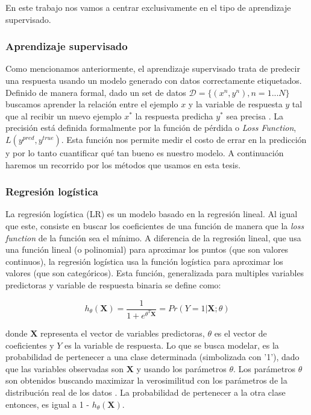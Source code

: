 En este trabajo nos vamos a centrar exclusivamente en el tipo de aprendizaje supervisado.

\subsubsection{Aprendizaje supervisado}

Como mencionamos anteriormente, el aprendizaje supervisado trata de predecir una respuesta usando un modelo generado con datos correctamente etiquetados. Definido de manera formal, dado un set de datos $ \mathcal{D} = \{(x^n, y^n), n = 1...N\}$  buscamos aprender la relación entre el ejemplo $x$ y la variable de respuesta $y$ tal que al recibir un nuevo ejemplo $x^*$ la respuesta predicha $y^*$ sea precisa \cite{Barber2011}. La precisión está definida formalmente por la función de pérdida o \textit{Loss Function}, $L(y^{pred}, y^{true})$. Esta función nos permite medir el costo de errar en la predicción y por lo tanto cuantificar qué tan bueno es nuestro modelo. A continuación haremos un recorrido por los métodos que usamos en esta tesis.

\subsubsection{Regresión logística}

La regresión logística (LR) es un modelo basado en la regresión lineal. Al igual que este, consiste en buscar los coeficientes de una función de manera que la \textit{loss function} de la función sea el mínimo. A diferencia de la regresión lineal, que usa una función lineal (o polinomial) para aproximar los puntos (que son valores continuos), la regresión logística usa la función logística para aproximar los valores (que son categóricos). Esta función, generalizada para multiples variables predictoras y variable de respuesta binaria se define como:

\begin{equation*}
h_{\theta}(\boldsymbol{X}) = \frac{1}{1 + e^{\theta^{T}\boldsymbol{X}}} = Pr(Y = 1 | \boldsymbol{X}; \theta)
\end{equation*}

donde $\boldsymbol{X}$ representa el vector de variables predictoras, $\theta$ es el vector de coeficientes y $Y$ es la variable de respuesta. Lo que se busca modelar, es la probabilidad de pertenecer a una clase determinada (simbolizada con '1'), dado que las variables observadas son $\boldsymbol{X}$ y usando los parámetros $\theta$. Los parámetros $\theta$ son obtenidos buscando maximizar la verosimilitud con los parámetros de la distribución real de los datos \cite{Hastie2001}. La probabilidad de pertenecer a la otra clase entonces, es igual a 1 - $h_{\theta}(\boldsymbol{X})$.

